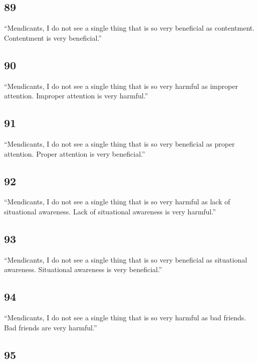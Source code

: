 \documentclass[12pt,openany]{book}%
\begin{document}
\subsection*{89 }

“Mendicants, I do not see a single thing that is so very beneficial as contentment. Contentment is very beneficial.” 

\subsection*{90 }

“Mendicants, I do not see a single thing that is so very harmful as improper attention. Improper attention is very harmful.” 

\subsection*{91 }

“Mendicants, I do not see a single thing that is so very beneficial as proper attention. Proper attention is very beneficial.” 

\subsection*{92 }

“Mendicants, I do not see a single thing that is so very harmful as lack of situational awareness. Lack of situational awareness is very harmful.” 

\subsection*{93 }

“Mendicants, I do not see a single thing that is so very beneficial as situational awareness. Situational awareness is very beneficial.” 

\subsection*{94 }

“Mendicants, I do not see a single thing that is so very harmful as bad friends. Bad friends are very harmful.” 

\subsection*{95 }
\end{document}
